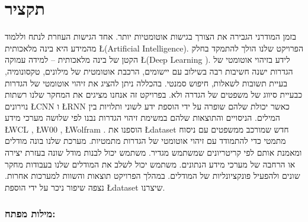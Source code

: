 \documentclass[11pt]{article}
\begin{document}
\section*{תקציר}
בזמן
המודרני הגבירה את הצורך בגישות אוטומטיות יותר. אחד הגישות העוזרת לנתח וללמוד מהמידע
היא בינה מלאכותית \L{(Artificial Intelligence)}. 
הפרויקט שלנו הולך להתמקד בחלק הקטן של
בינה מלאכותית – למידה עמוקה \L{(Deep Learning )}.
לידע בזיהוי אוטומטי של הגדרות ישנה חשיבות רבה בשילוב עם יישומים, הרכבת אוטומטית של
מילונים, טקסונומיה, בעיית תשובות לשאלות, חיפוש סמנטי. בהכללה ניתן להציג את זיהוי אוטומטי
של הגדרות כבעיית סיווג של משפטים של הגדרה ולא.
בפרויקט זה אנחנו מציגים את המחקר שלנו רשתות נוירונים \L{CNN} ו \L{RNN} כאשר יכולת שלהם
שופרה על ידי הוספת ידע לשוני ותלויות בין המילים. הניסויים והתוצאות שלהם במשימת זיהוי
הגדרות נבנו לפי שלושה מערכי מידע \L{WCL} , \L{W00} , \L{Wolfram} .
הוספנו את \L{dataset} חדש שמורכב ממשפטים עם ניסוח מתמטי כדי להתמודד עם זיהוי אוטומטי של
הגדרות מתמטיות.
מערכת שלנו בונה מודלים ומאמנת אותם לפי קריטריונים שמשתמש מגדיר. משתמש יכול לבנות
מודל שונה בעזרת יצירה או הרחבה של מערכי מידע הנתונים.
משתמש יכול לשלב את המודלים שלנו בעבודות מחקר שונים ולהפעיל פונקציונליות של המודלים.
במהלך הפרויקט תוצאות והשוות למערכות אחרות. נצפה שיפור ניכר על ידי הוספת \L{dataset}
שיצרנו.
\subsubsection*{מילות מפתח:}
\end{document}

